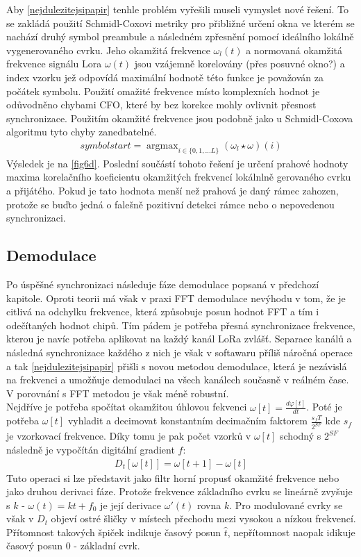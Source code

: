 \documentclass{ctuthesis}
\newcommand{\argmax}{\mathop{\mathrm{argmax}}}
\begin{document}
Aby \ref{nejdulezitejsipapir} tenhle problém vyřešili museli vymyslet nové řešení. To se zakládá použití Schmidl-Coxovi metriky pro přibližné určení okna ve kterém se nachází druhý symbol preambule a následném zpřesnění pomocí ideálního lokálně vygenerovaného cvrku. Jeho okamžitá frekvence $\omega_{l}(t)$ a normovaná okamžitá frekvence signálu Lora  $\omega(t)$ jsou vzájemně korelovány (přes posuvné okno?) a index vzorku jež odpovídá maximální hodnotě této funkce je považován za počátek symbolu. Použití omažité frekvence místo komplexních hodnot je odůvodněno chybami CFO, které by bez korekce mohly ovlivnit přesnost synchronizace. Použitím okamžité frekvence jsou podobně jako u Schmidl-Coxova algoritmu tyto chyby zanedbatelné.
\begin{align}
symbol start = \argmax_{i \in \{0,1,...L\}} (\omega_{l} \star \omega)(i)
\label{eq:lora6}
\end{align}
Výsledek je na \ref{fig6d}. Poslední součástí tohoto řešení je určení prahové hodnoty maxima korelačního koeficientu okamžitých frekvencí lokálnlně gerovaného cvrku a přijátého. Pokud je tato hodnota menší než prahová je daný rámec zahozen, protože se buďto jedná o falešně pozitivní detekci rámce nebo o nepovedenou synchronizaci.
\subsection{Demodulace}
\label{subsec:demodulace}
Po úspěšné synchronizaci následuje fáze demodulace popsaná v předchozí kapitole. Oproti teorii má však v praxi FFT demodulace nevýhodu v tom, že je citlivá na odchylku frekvence, která způsobuje posun hodnot FFT a tím i odečítaných hodnot chipů. Tím pádem je potřeba přesná synchronizace frekvence, kterou je navíc potřeba aplikovat na každý kanál LoRa zvlášť. Separace kanálů a následná synchronizace každého z nich je však v softawaru příliš náročná operace a tak \ref{nejdulezitejsipapir} přišli s novou metodou demodulace, která je nezávislá na frekvenci a umožňuje demodulaci na všech kanálech současně v reálném čase. V porovnání s FFT metodou je však méně robustní.\\
Nejdříve je potřeba spočítat okamžitou úhlovou fekvenci $\omega[t]=\frac{d\varphi[t]}{dt}$. Poté je potřeba $\omega[t]$ vyhladit a decimovat konstantním decimačním faktorem $\frac{s_fT}{2^{SF}}$ kde $s_f$ je vzorkovací frekvence. Díky tomu je pak počet vzorků v $\omega[t]$ schodný s $2^{SF}$ následně je vypočítán digitální gradient $f$:
\begin{align}
D_t[\omega[t]] = \omega[t+1]-\omega[t]
\label{eq:lora7}
\end{align}
Tuto operaci si lze představit jako filtr horní propusť okamžité frekvence nebo jako druhou derivaci fáze. Protože frekvence základního cvrku se lineárně zvyšuje s $k$ - $\omega(t) = kt + f_0$ je její derivace $\omega'(t)$ rovna $k$. Pro modulované cvrky se však v $D_t$ objeví ostré šličky v místech přechodu mezi vysokou a nízkou frekvencí. Přítomnost takových špiček indikuje časový posun $\hat{t}$, nepřítomnost naopak idikuje časový posun 0 - základní cvrk.\\
\end{document}
